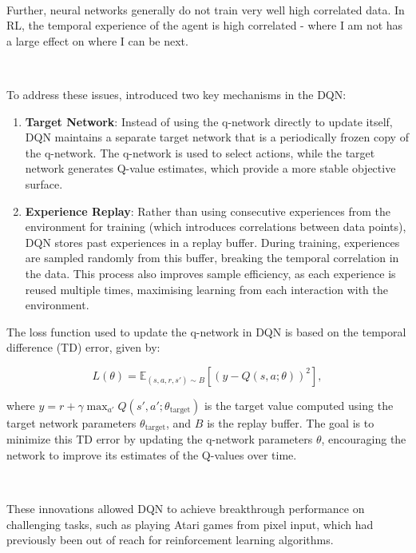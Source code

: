 \documentclass{article}
\begin{document}
\

Further, neural networks generally do not train very well high correlated data. In RL, the temporal experience of the agent is high correlated - where I am not has a large effect on where I can be next. 

\

To address these issues, \citet{mnih2013playing} introduced two key mechanisms in the DQN:

\begin{enumerate}
	\item \textbf{Target Network}: Instead of using the q-network directly to update itself, DQN maintains a separate target network that is a periodically frozen copy of the q-network. The q-network is used to select actions, while the target network generates Q-value estimates, which provide a more stable objective surface.
	\item \textbf{Experience Replay}: Rather than using consecutive experiences from the environment for training (which introduces correlations between data points), DQN stores past experiences in a replay buffer. During training, experiences are sampled randomly from this buffer, breaking the temporal correlation in the data. This process also improves sample efficiency, as each experience is reused multiple times, maximising learning from each interaction with the environment.

\end{enumerate}

The loss function used to update the q-network in DQN is based on the temporal difference (TD) error, given by:

\begin{equation}
L(\theta) = \mathbb{E}_{(s, a, r, s') \sim B} \left[ \left( y - Q(s, a; \theta) \right)^2 \right],
\end{equation}

where $y = r + \gamma \max_{a'} Q(s', a'; \theta_\text{target})$ is the target value computed using the target network parameters $\theta_\text{target}$, and $B$ is the replay buffer. The goal is to minimize this TD error by updating the q-network parameters $\theta$, encouraging the network to improve its estimates of the Q-values over time.

\

These innovations allowed DQN to achieve breakthrough performance on challenging tasks, such as playing Atari games from pixel input, which had previously been out of reach for reinforcement learning algorithms. \citep{mnih2013playing}
\end{document}

